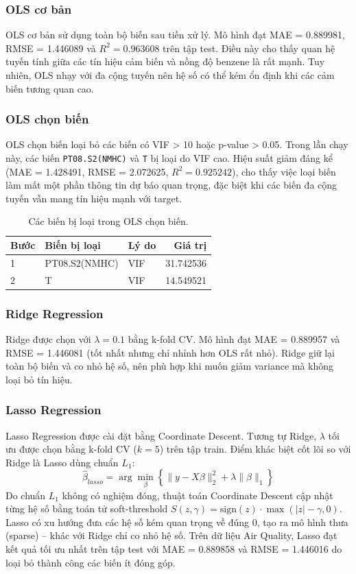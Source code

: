 \documentclass[a4paper]{article}
\begin{document}
\subsubsection{OLS cơ bản}
OLS cơ bản sử dụng toàn bộ biến sau tiền xử lý. Mô hình đạt MAE = 0.889981, RMSE = 1.446089 và $R^2 = 0.963608$ trên tập test. Điều này cho thấy quan hệ tuyến tính giữa các tín hiệu cảm biến và nồng độ benzene là rất mạnh. Tuy nhiên, OLS nhạy với đa cộng tuyến nên hệ số có thể kém ổn định khi các cảm biến tương quan cao.

\subsubsection{OLS chọn biến}
OLS chọn biến loại bỏ các biến có VIF > 10 hoặc p-value > 0.05. Trong lần chạy này, các biến \texttt{PT08.S2(NMHC)} và \texttt{T} bị loại do VIF cao. Hiệu suất giảm đáng kể (MAE = 1.428491, RMSE = 2.072625, $R^2 = 0.925242$), cho thấy việc loại biến làm mất một phần thông tin dự báo quan trọng, đặc biệt khi các biến đa cộng tuyến vẫn mang tín hiệu mạnh với target.

\begin{table}[H]
\centering
\begin{tabular}{l l l r}
\hline
Bước & Biến bị loại & Lý do & Giá trị \\
\hline
1 & PT08.S2(NMHC) & VIF & 31.742536 \\
2 & T & VIF & 14.549521 \\
\hline
\end{tabular}
\caption{Các biến bị loại trong OLS chọn biến.}
\end{table}

\subsubsection{Ridge Regression}
Ridge được chọn với $\lambda=0.1$ bằng k-fold CV. Mô hình đạt MAE = 0.889957 và RMSE = 1.446081 (tốt nhất nhưng chỉ nhỉnh hơn OLS rất nhỏ). Ridge giữ lại toàn bộ biến và co nhỏ hệ số, nên phù hợp khi muốn giảm variance mà không loại bỏ tín hiệu.

\subsubsection{Lasso Regression}
Lasso Regression được cài đặt bằng Coordinate Descent. Tương tự Ridge, $\lambda$ tối ưu được chọn bằng k-fold CV ($k=5$) trên tập train. Điểm khác biệt cốt lõi so với Ridge là Lasso dùng chuẩn $L_1$:
\begin{equation}
\hat{\beta}_{lasso} = \arg\min_{\beta}\left\{\lVert y - X\beta \rVert_2^2 + \lambda \lVert \beta \rVert_1\right\}
\end{equation}
Do chuẩn $L_1$ không có nghiệm đóng, thuật toán Coordinate Descent cập nhật từng hệ số bằng toán tử soft-threshold $S(z,\gamma)=\text{sign}(z)\cdot\max(|z|-\gamma,0)$. Lasso có xu hướng đưa các hệ số kém quan trọng về đúng 0, tạo ra mô hình thưa (sparse) -- khác với Ridge chỉ co nhỏ hệ số. Trên dữ liệu Air Quality, Lasso đạt kết quả tối ưu nhất trên tập test với MAE = 0.889858 và RMSE = 1.446016 do loại bỏ thành công các biến ít đóng góp.
\end{document}
